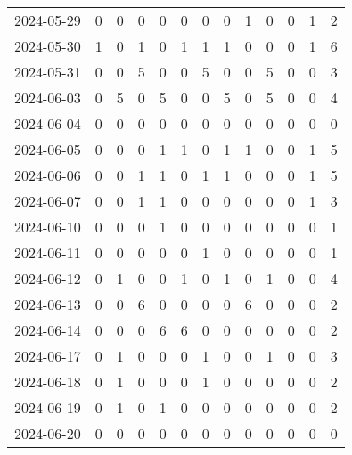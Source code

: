 \documentclass[dvipdfmx,oneside]{article}
\begin{document}
\begin{longtable}{lcccccccccccc}
        2024-05-29 &     0 &     0 &     0 &     0 &     0 &     0 &     0 &     1 &     0 &     0 &     1 &      2 \\
        2024-05-30 &     1 &     0 &     1 &     0 &     1 &     1 &     1 &     0 &     0 &     0 &     1 &      6 \\
        2024-05-31 &     0 &     0 &     5 &     0 &     0 &     5 &     0 &     0 &     5 &     0 &     0 &      3 \\
        2024-06-03 &     0 &     5 &     0 &     5 &     0 &     0 &     5 &     0 &     5 &     0 &     0 &      4 \\
        2024-06-04 &     0 &     0 &     0 &     0 &     0 &     0 &     0 &     0 &     0 &     0 &     0 &      0 \\
        2024-06-05 &     0 &     0 &     0 &     1 &     1 &     0 &     1 &     1 &     0 &     0 &     1 &      5 \\
        2024-06-06 &     0 &     0 &     1 &     1 &     0 &     1 &     1 &     0 &     0 &     0 &     1 &      5 \\
        2024-06-07 &     0 &     0 &     1 &     1 &     0 &     0 &     0 &     0 &     0 &     0 &     1 &      3 \\
        2024-06-10 &     0 &     0 &     0 &     1 &     0 &     0 &     0 &     0 &     0 &     0 &     0 &      1 \\
        2024-06-11 &     0 &     0 &     0 &     0 &     0 &     1 &     0 &     0 &     0 &     0 &     0 &      1 \\
        2024-06-12 &     0 &     1 &     0 &     0 &     1 &     0 &     1 &     0 &     1 &     0 &     0 &      4 \\
        2024-06-13 &     0 &     0 &     6 &     0 &     0 &     0 &     0 &     6 &     0 &     0 &     0 &      2 \\
        2024-06-14 &     0 &     0 &     0 &     6 &     6 &     0 &     0 &     0 &     0 &     0 &     0 &      2 \\
        2024-06-17 &     0 &     1 &     0 &     0 &     0 &     1 &     0 &     0 &     1 &     0 &     0 &      3 \\
        2024-06-18 &     0 &     1 &     0 &     0 &     0 &     1 &     0 &     0 &     0 &     0 &     0 &      2 \\
        2024-06-19 &     0 &     1 &     0 &     1 &     0 &     0 &     0 &     0 &     0 &     0 &     0 &      2 \\
        2024-06-20 &     0 &     0 &     0 &     0 &     0 &     0 &     0 &     0 &     0 &     0 &     0 &      0 \\

\end{longtable}
\end{document}
